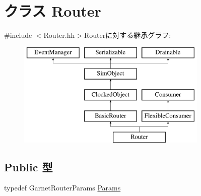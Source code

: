 \hypertarget{classRouter}{
\section{クラス Router}
\label{classRouter}
}


{\ttfamily \#include $<$Router.hh$>$}Routerに対する継承グラフ:\begin{figure}[H]
\begin{center}
\leavevmode
\includegraphics[height=5cm]{classRouter}
\end{center}
\end{figure}
\subsection*{Public 型}
\begin{DoxyCompactItemize}
\item 
typedef GarnetRouterParams \hyperlink{classRouter_aefbd30db7d0c203dbe4553fdfe3c2b0e}{Params}
\end{DoxyCompactItemize}
